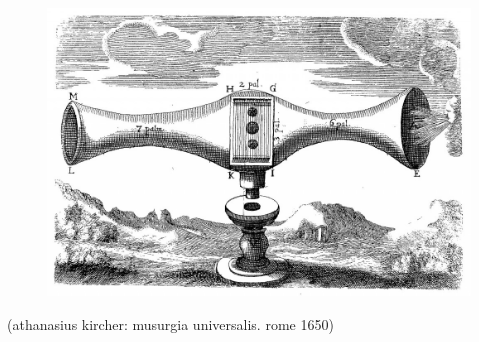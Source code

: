 \documentclass[12pt,a4paper,british,landscape]{article}
\begin{document}
\begin{figure}[h]
    \vspace{0.15cm}
    \begin{center}
        \includegraphics[scale=0.6]{ harp0.jpg }
    \end{center}
\end{figure}

\begin{center}
    (athanasius kircher: musurgia universalis. rome 1650)
\end{center}
\end{document}
